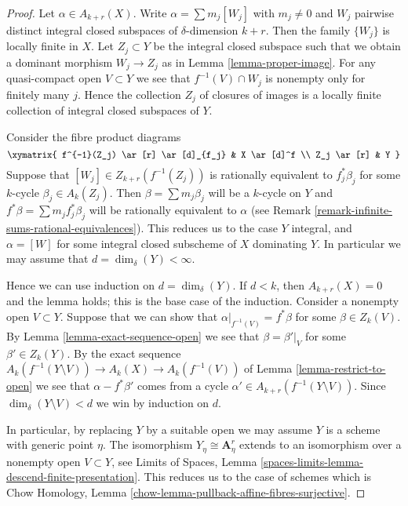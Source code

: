 \begin{proof}
Let $\alpha \in A_{k + r}(X)$. Write $\alpha = \sum m_j[W_j]$ with
$m_j \not = 0$ and $W_j$ pairwise distinct integral closed subspaces of
$\delta$-dimension $k + r$. Then the family $\{W_j\}$
is locally finite in $X$. Let $Z_j \subset Y$ be the integral
closed subspace such that we obtain a dominant morphism $W_j \to Z_j$
as in Lemma \ref{lemma-proper-image}. For any quasi-compact open
$V \subset Y$ we see that $f^{-1}(V) \cap W_j$
is nonempty only for finitely many $j$. Hence the
collection $Z_j$ of closures of images is a locally finite collection
of integral closed subspaces of $Y$.

\medskip\noindent
Consider the fibre product diagrams
$$
\xymatrix{
f^{-1}(Z_j) \ar[r] \ar[d]_{f_j} & X \ar[d]^f \\
Z_j \ar[r] & Y
}
$$
Suppose that $[W_j] \in Z_{k + r}(f^{-1}(Z_j))$
is rationally equivalent to $f_j^*\beta_j$ for some
$k$-cycle $\beta_j \in A_k(Z_j)$. Then
$\beta = \sum m_j \beta_j$ will be a $k$-cycle on $Y$
and $f^*\beta = \sum m_j f_j^*\beta_j$ will be rationally
equivalent to $\alpha$ (see
Remark \ref{remark-infinite-sums-rational-equivalences}).
This reduces us to the case $Y$ integral, and
$\alpha = [W]$ for some integral closed subscheme
of $X$ dominating $Y$. In particular we may
assume that $d = \dim_\delta(Y) < \infty$.

\medskip\noindent
Hence we can use induction on $d = \dim_\delta(Y)$.
If $d < k$, then $A_{k + r}(X) = 0$ and the lemma holds;
this is the base case of the induction.
Consider a nonempty open $V \subset Y$.
Suppose that we can show that $\alpha|_{f^{-1}(V)} = f^*\beta$
for some $\beta \in Z_k(V)$. By Lemma \ref{lemma-exact-sequence-open}
we see that
$\beta = \beta'|_V$ for some $\beta' \in Z_k(Y)$.
By the exact sequence
$A_k(f^{-1}(Y \setminus V)) \to A_k(X) \to A_k(f^{-1}(V))$
of Lemma \ref{lemma-restrict-to-open}
we see that $\alpha - f^*\beta'$ comes from
a cycle $\alpha' \in A_{k + r}(f^{-1}(Y \setminus V))$.
Since $\dim_\delta(Y \setminus V) < d$ we win by
induction on $d$.

\medskip\noindent
In particular, by replacing $Y$ by a suitable open we may assume
$Y$ is a scheme with generic point $\eta$. The isomorphism
$Y_\eta \cong \mathbf{A}^r_\eta$ extends to an isomorphism
over a nonempty open $V \subset Y$, see
Limits of Spaces, Lemma \ref{spaces-limits-lemma-descend-finite-presentation}.
This reduces us to the case of schemes which is
Chow Homology, Lemma \ref{chow-lemma-pullback-affine-fibres-surjective}.
\end{proof}

